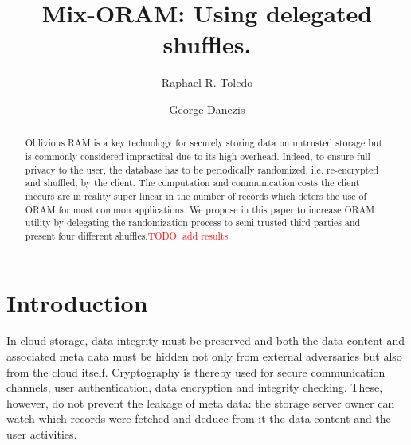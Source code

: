 \documentclass[USenglish,oneside,twocolumn]{article}
\newcommand{\todo}[1]{\textcolor{red}{TODO: #1}}
\begin{document}
 
\author[1]{Raphael R. Toledo}

\author[2]{George Danezis}



  \title{Mix-ORAM: Using delegated shuffles.}

  \begin{abstract}
{
Oblivious RAM is a key technology for securely storing data on untrusted storage but is commonly considered impractical due to its high overhead. Indeed, to ensure full privacy to the user, the database has to be  periodically randomized, i.e. re-encrypted and shuffled, by the client. The computation and communication costs the client inccurs are in reality super linear in the number of records which deters the use of ORAM for most common applications. We propose in this paper to increase ORAM utility by delegating the randomization process to semi-trusted third parties and present four different shuffles.\todo{add results}
}
\end{abstract}



\maketitle
%
\section{Introduction}\label{Introduction}
%
In cloud storage, data integrity must be preserved and both the data content and associated meta data must be hidden not only from external adversaries but also from the cloud itself.
Cryptography is thereby used for secure communication channels, user authentication, data encryption and integrity checking.
These, however, do not prevent the leakage of meta data: the storage server owner can watch which records were fetched and deduce from it the data content and the user activities. 
\end{document}
